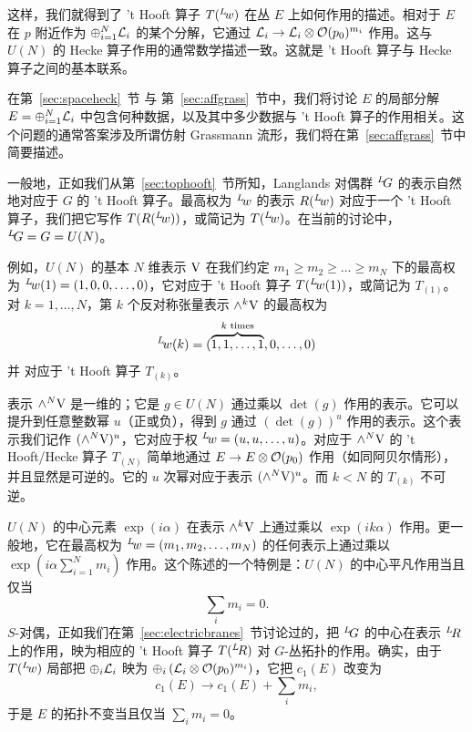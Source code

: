 这样，我们就得到了 't Hooft 算子 $T(^L\negthinspace w)$ 在丛 $E$ 上如何作用的描述。相对于 $E$ 在 $p$ 附近作为 $\oplus_{i=1}^N{\cal L}_i$ 的某个分解，它通过 ${\cal L}_i\to {\cal L}_i\otimes {\cal O}(p_0)^{m_i}$ 作用。这与 $U(N)$ 的 Hecke 算子作用的通常数学描述一致。这就是 't Hooft 算子与 Hecke 算子之间的基本联系。

在第~\ref{sec:spaceheck}~节 与 第~\ref{sec:affgrass}~节中，我们将讨论 $E$ 的局部分解 $E=\oplus_{i=1}^N{\cal L}_i$ 中包含何种数据，以及其中多少数据与 't Hooft 算子的作用相关。这个问题的通常答案涉及所谓仿射 Grassmann 流形，我们将在第~\ref{sec:affgrass}~节中简要描述。

\par{}

一般地，正如我们从第~\ref{sec:tophooft}~节所知，Langlands 对偶群 $^L\negthinspace G$ 的表示自然地对应于 $G$ 的 't Hooft 算子。最高权为 $^L\negthinspace w$ 的表示 $R(^L\negthinspace w)$ 对应于一个 't Hooft 算子，我们把它写作 $T(R(^L\negthinspace w))$，或简记为 $T(^L\negthinspace w)$。在当前的讨论中，$^L\negthinspace G=G=U(N)$。

例如，$U(N)$ 的基本 $N$ 维表示 $\VV$ 在我们约定 $m_1\geq m_2\geq \dots\geq m_N$ 下的最高权为 $^L\negthinspace w(1)=(1,0,0,\dots,0)$，它对应于 't Hooft 算子 $T(^L\negthinspace w(1))$，或简记为 $T_{(1)}$。对 $k=1,\dots,N$，第 $k$ 个反对称张量表示 $\wedge^k\VV$ 的最高权为 %
\setcounter{equation}{12}
\begin{equation}\label{eq:nyto}
^L\negthinspace
w(k)=(\overbrace{1,1,\dots,1}^{\text {$k$ times}},0,\dots,0)
\end{equation}
 并
对应于 't Hooft 算子 $T_{(k)}$。

表示 $\wedge^N\VV$ 是一维的；它是 $g\in U(N)$ 通过乘以 $\det(g)$ 作用的表示。它可以提升到任意整数幂 $u$（正或负），得到 $g$ 通过 $(\det(g))^u$ 作用的表示。这个表示我们记作 $(\wedge^N\VV)^u$，它对应于权 $^L\negthinspace w=(u,u,\dots,u)$。对应于 $\wedge^N\VV$ 的 't Hooft/Hecke 算子 $T_{(N)}$ 简单地通过 $E\to E\otimes {\cal O}(p_0)$ 作用（如同阿贝尔情形），并且显然是可逆的。它的 $u$ 次幂对应于表示 $(\wedge^N\VV)^u$。而 $k<N$ 的 $T_{(k)}$ 不可逆。

$U(N)$ 的中心元素 $\exp(i\alpha)$ 在表示 $\wedge^k\VV$ 上通过乘以 $\exp(ik\alpha)$ 作用。更一般地，它在最高权为 $^L\negthinspace w=(m_1,m_2,\dots,m_N)$ 的任何表示上通过乘以 $\exp(i\alpha\sum_{i=1}^Nm_i)$ 作用。这个陈述的一个特例是：$U(N)$ 的中心平凡作用当且仅当 %
\setcounter{equation}{13}
\begin{equation}\label{eq:hoty}
\sum_im_i=0.
\end{equation}
 $S$-对偶，正如我们在第~\ref{sec:electricbranes}~节讨论过的，把 $^L\negthinspace G$ 的中心在表示 $^L\negthinspace R$ 上的作用，映为相应的 't Hooft 算子 $T(^L\negthinspace R)$ 对 $G$-丛拓扑的作用。确实，由于 $T(^L\negthinspace w)$ 局部把 $\oplus_i{\cal L}_i$ 映为 $\oplus_i\left({\cal L}_i\otimes {\cal O}(p_0)^{m_i}\right)$，它把 $c_1(E)$ 改变为 %
\begin{equation*}
\tag*{(9.15)}
c_1(E)\to c_1(E)+\sum_im_i,
\end{equation*}
 于是
$E$ 的拓扑不变当且仅当 $\sum_im_i=0$。

